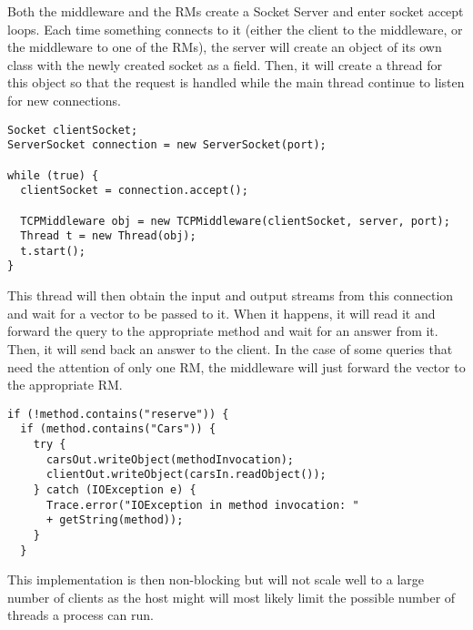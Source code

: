 \documentclass[12pt]{article}
\theoremstyle{plain}%
\theoremstyle{definition}
\theoremstyle{remark}
\begin{document}
Both the middleware and the RMs create a Socket Server and enter
socket accept loops. Each time something connects to it (either the
client to the middleware, or the middleware to one of the RMs), the
server will create an object of its own class with the newly created
socket as a field. Then, it will create a thread for this object so
that the request is handled while the main thread continue to listen
for new connections. 
\begin{lstlisting}
Socket clientSocket;
ServerSocket connection = new ServerSocket(port);

while (true) {
  clientSocket = connection.accept();
  
  TCPMiddleware obj = new TCPMiddleware(clientSocket, server, port);
  Thread t = new Thread(obj);
  t.start();
}
\end{lstlisting}
This thread will then obtain the input and output
streams from this connection and wait for a vector to be passed to
it. When it happens, it will read it and forward the query to the
appropriate method and wait for an answer from it. Then, it will send
back an answer to the client. In the case of some queries that need
the attention of only one RM, the middleware will just forward the
vector to the appropriate RM. 
\begin{lstlisting}
if (!method.contains("reserve")) {
  if (method.contains("Cars")) {
    try {
      carsOut.writeObject(methodInvocation);
      clientOut.writeObject(carsIn.readObject());
    } catch (IOException e) {
      Trace.error("IOException in method invocation: "
      + getString(method));
    }
  }
\end{lstlisting}
This implementation is then non-blocking but will
not scale well to a large number of clients as the host might will
most likely limit the possible number of threads a process can run.
\end{document}
